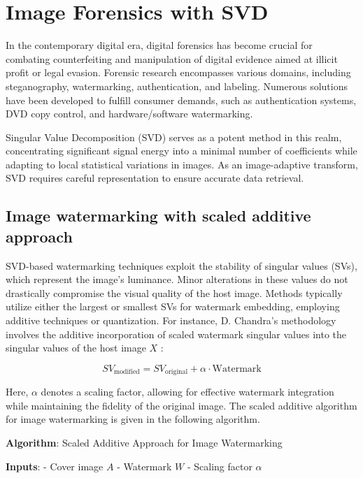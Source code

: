 \documentclass[
  journal,
]{IEEEtran}%
\begin{document}
\section{Image Forensics with SVD}\label{image-forensics-with-svd}

In the contemporary digital era, digital forensics has become crucial
for combating counterfeiting and manipulation of digital evidence aimed
at illicit profit or legal evasion. Forensic research encompasses
various domains, including steganography, watermarking, authentication,
and labeling. Numerous solutions have been developed to fulfill consumer
demands, such as authentication systems, DVD copy control, and
hardware/software watermarking.

Singular Value Decomposition (SVD) serves as a potent method in this
realm, concentrating significant signal energy into a minimal number of
coefficients while adapting to local statistical variations in images.
As an image-adaptive transform, SVD requires careful representation to
ensure accurate data retrieval.

\subsection{Image watermarking with scaled additive
approach}\label{image-watermarking-with-scaled-additive-approach}

SVD-based watermarking techniques exploit the stability of singular
values (SVs), which represent the image's luminance. Minor alterations
in these values do not drastically compromise the visual quality of the
host image. Methods typically utilize either the largest or smallest SVs
for watermark embedding, employing additive techniques or quantization.
For instance, D. Chandra's methodology involves the additive
incorporation of scaled watermark singular values into the singular
values of the host image \(X\)
:

\[
SV_{\text{modified}} = SV_{\text{original}} + \alpha \cdot \text{Watermark}
\]

Here, \(\alpha\) denotes a scaling factor, allowing for effective
watermark integration while maintaining the fidelity of the original
image. The scaled additive algorithm for image watermarking is given in
the following algorithm.

\label{algo-SA}
\textbf{Algorithm}: Scaled Additive Approach for Image Watermarking

\textbf{Inputs}: - Cover image \(A\) - Watermark \(W\) - Scaling factor
\(\alpha\)
\end{document}
